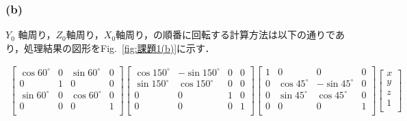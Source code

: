 \documentclass[a4paper,10pt]{jsarticle}
\begin{document}
\subsubsection{(b)}
$Y_0$ 軸周り，$Z_0$軸周り，$X_0$軸周り，の順番に回転する計算方法は以下の通りであり，処理結果の図形をFig.~\ref{fig:課題1(b)}に示す．

\begin{eqnarray}
\label{eq:a}
  \left[
    \begin{array}{cccc}
      \cos{60^\circ} & 0 & \sin{60^\circ} & 0 \\
      0 & 1 & 0 & 0\\
      \sin{60^\circ} & 0 & \cos{60^\circ} & 0\\
      0 & 0 & 0 & 1\\
    \end{array}
  \right]\left[
    \begin{array}{cccc}
      \cos{150^\circ} & -\sin{150^\circ} & 0 & 0 \\
      \sin{150^\circ} & \cos{150^\circ} & 0 & 0\\
      0 & 0 & 1 & 0\\
      0 & 0 & 0 & 1\\
    \end{array}
  \right]\left[
    \begin{array}{cccc}
      1 & 0 & 0 & 0 \\
      0 & \cos{45^\circ} & -\sin{45^\circ} & 0\\
      0 & \sin{45^\circ} & \cos{45^\circ} & 0\\
      0 & 0 & 0 & 1\\
    \end{array}
  \right]\left[
    \begin{array}{c}
      x\\
      y\\
      z\\
      1\\
    \end{array}
  \right]
\end{eqnarray}
\end{document}
